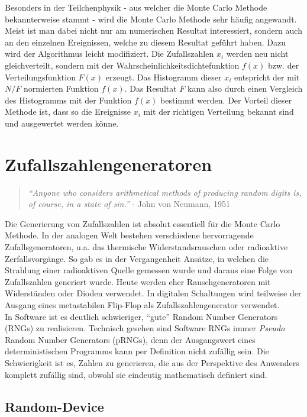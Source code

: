 \documentclass{book}
\begin{document}
\begin{refsection}
Besonders in der Teilchenphysik - aus welcher die Monte Carlo Methode bekannterweise stammt - wird die Monte Carlo Methode sehr häufig angewandt. Meist ist man dabei nicht nur am numerischen Resultat interessiert, sondern auch an den einzelnen Ereignissen, welche zu diesem Resultat geführt haben. Dazu wird der Algorithmus leicht modifiziert. Die Zufallszahlen $x_i$ werden neu nicht gleichverteilt, sondern mit der Wahrscheinlichkeitsdichtefunktion $f(x)$ bzw. der Verteilungsfunktion $F(x)$ erzeugt. Das Histogramm dieser $x_i$ entspricht der mit $N/F$ normierten Funktion $f(x)$. Das Resultat $F$ kann also durch einen Vergleich des Histogramms mit der Funktion $f(x)$ bestimmt werden. Der Vorteil dieser Methode ist, dass so die Ereignisse $x_i$ mit der richtigen Verteilung bekannt sind und ausgewertet werden könne.


\section{Zufallszahlengeneratoren} 

\begin{quote}
\textit{“Anyone who considers arithmetical methods of producing random digits is, of course, in a state of sin.”} - John von Neumann, 1951
\end{quote}

Die Generierung von Zufallszahlen ist absolut essentiell für die Monte Carlo Methode. In der analogen Welt bestehen verschiedene hervorragende Zufallsgeneratoren, u.a. das thermische Widerstandsrauschen oder radioaktive Zerfallsvorgänge. So gab es in der Vergangenheit Ansätze, in welchen die Strahlung einer radioaktiven Quelle gemessen wurde und daraus eine Folge von Zufallszahlen generiert wurde. Heute werden eher Rauschgeneratoren mit Widerständen oder Dioden verwendet. In digitalen Schaltungen wird teilweise der Ausgang eines metastabilen Flip-Flop als Zufallszahlengenerator verwendet.\\

In Software ist es deutlich schwieriger, ``gute'' Random Number Generators (RNGs) zu realisieren. Technisch gesehen sind Software RNGs immer \textit{Pseudo} Random Number Generators (pRNGs),  denn der Ausgangswert eines deterministischen Programms kann per Definition nicht zufällig sein. Die Schwierigkeit ist es, Zahlen zu generieren, die aus der Perspektive des Anwenders komplett zufällig sind, obwohl sie eindeutig mathematisch definiert sind.

\newpage
\subsection{Random-Device} \label{subsec:RandomDev}


\end{refsection}
\end{document}
